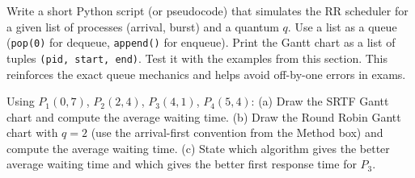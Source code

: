 \documentclass[11pt]{article}
\begin{document}
\begin{experience}
Write a short Python script (or pseudocode) that simulates the RR scheduler for a given list of processes (arrival, burst) and a quantum $q$. Use a list as a queue (\texttt{pop(0)} for dequeue, \texttt{append()} for enqueue). Print the Gantt chart as a list of tuples \texttt{(pid, start, end)}. Test it with the examples from this section. This reinforces the exact queue mechanics and helps avoid off-by-one errors in exams.
\end{experience}

\begin{exercice}[Practice]
Using $P_1(0,7)$, $P_2(2,4)$, $P_3(4,1)$, $P_4(5,4)$:
(a) Draw the SRTF Gantt chart and compute the average waiting time.
(b) Draw the Round Robin Gantt chart with $q=2$ (use the arrival-first convention from the Method box) and compute the average waiting time.
(c) State which algorithm gives the better average waiting time and which gives the better first response time for $P_3$.
\end{exercice}
\end{document}
